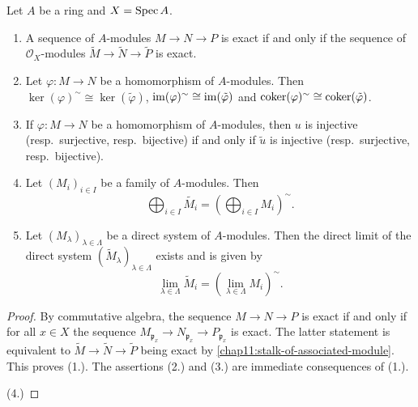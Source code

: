 \begin{theorem}\label{chap11:tilde-construction-is-exact}
	Let $A$ be a ring and $X = \operatorname{Spec} A$. 
	\begin{enumerate}
		\item A sequence of $A$-modules $M \to N \to P$ is exact if and only if the sequence of $\mathcal{O}_X$-modules $\tilde{M} \to \tilde{N} \to \tilde{P}$ is exact.
		
		\item Let $\varphi \colon M \to N$ be a homomorphism of $A$-modules. Then $\ker(\varphi)^{\sim} \cong \ker(\tilde{\varphi})$, $\operatorname{im}(\varphi)^{\sim} \cong \operatorname{im}(\tilde{\varphi})$ and $\operatorname{coker}(\varphi)^{\sim} \cong \operatorname{coker}(\tilde{\varphi})$.
		
		\item If $\varphi \colon M \to N$ be a homomorphism of $A$-modules, then $u$ is injective (resp.~surjective, resp.~bijective) if and only if $\tilde{u}$ is injective (resp.~surjective, resp.~bijective).
		
		\item Let $(M_i)_{i \in I}$ be a family of $A$-modules. Then
		\begin{equation*}
			\bigoplus_{i \in I} \tilde{M_i} = \left(\bigoplus_{i \in I} M_i\right)^{\sim}.
		\end{equation*}
		
		\item Let $(M_\lambda)_{\lambda \in \Lambda}$ be a direct system of $A$-modules. Then the direct limit of the direct system $(\tilde{M}_\lambda)_{\lambda \in \Lambda}$ exists and is given by
		\begin{equation*}
			\lim_{\lambda \in \Lambda} \tilde{M}_i = {\left(\lim_{\lambda \in \Lambda} {M}_i\right)}^\sim.
		\end{equation*}
	\end{enumerate}
\end{theorem}
\begin{proof}
	By commutative algebra, the sequence $M \to N \to P$ is exact if and only if for all $x \in X$ the sequence $M_{\mathfrak{p}_x} \to N_{\mathfrak{p}_x} \to P_{\mathfrak{p}_x}$ is exact. The latter statement is equivalent to $\tilde{M} \to \tilde{N} \to \tilde{P}$ being exact by \cref{chap11:stalk-of-associated-module}. This proves (1.). The assertions (2.) and (3.) are immediate consequences of (1.).
	
	(4.) 
\end{proof}

